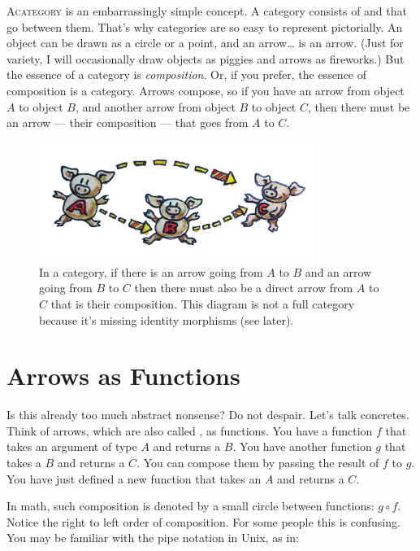 
\lettrine[lhang=0.17]{A}{category} is an embarrassingly simple concept.
A category consists of  and  that go between them. That's
why categories are so easy to represent pictorially. An object can be
drawn as a circle or a point, and an arrow\ldots{} is an arrow. (Just
for variety, I will occasionally draw objects as piggies and arrows as
fireworks.) But the essence of a category is \emph{composition}. Or, if you
prefer, the essence of composition is a category. Arrows compose, so
if you have an arrow from object $A$ to object $B$, and another arrow from
object $B$ to object $C$, then there must be an arrow --- their composition
--- that goes from $A$ to $C$.

\begin{figure}
  \centering
  \includegraphics[width=0.8\textwidth]{images/img_1330.jpg}
  \caption{In a category, if there is an arrow going from $A$ to $B$ and an arrow going from $B$ to $C$
    then there must also be a direct arrow from $A$ to $C$ that is their composition. This diagram is not a full
    category because it’s missing identity morphisms (see later).}
\end{figure}

\section{Arrows as Functions}

Is this already too much abstract nonsense? Do not despair. Let's talk
concretes. Think of arrows, which are also called , as
functions. You have a function $f$ that takes an argument of type $A$ and
returns a $B$. You have another function $g$ that takes a $B$ and returns a $C$.
You can compose them by passing the result of $f$ to $g$. You have just
defined a new function that takes an $A$ and returns a $C$.

In math, such composition is denoted by a small circle between
functions: $g \circ f$. Notice the right to left order of composition. For some
people this is confusing. You may be familiar with the pipe notation in
Unix, as in:

